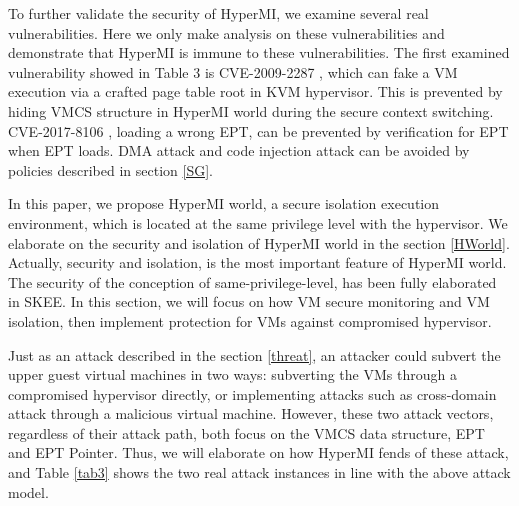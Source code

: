 \documentclass[conference]{IEEEtran}
\begin{document}
To further validate the security of HyperMI, we examine several real vulnerabilities. Here we only make analysis on these vulnerabilities and demonstrate that HyperMI is immune to these vulnerabilities. The first examined vulnerability showed in Table 3 is CVE-2009-2287 \cite{cve2009}, which can fake a VM execution via a crafted page table root in KVM hypervisor. This is prevented by hiding VMCS structure in HyperMI world during the secure context switching. CVE-2017-8106 \cite{cve2017}, loading a wrong EPT, can be prevented by verification for EPT when EPT loads. DMA attack and code injection attack can be avoided by policies described in section \ref{SG}.

\fi




In this paper, we propose HyperMI world, a secure isolation execution environment, which is located at the same privilege level with the hypervisor. We elaborate on the security and isolation of HyperMI world in the section \ref{HWorld}. Actually, security and isolation, is the most important feature of HyperMI world. The security of the conception of same-privilege-level, has been fully elaborated in SKEE. 
In this section, we will focus on how VM secure monitoring and VM isolation, then implement protection for VMs against compromised hypervisor. 

Just as an attack described in the section \ref{threat}, an attacker could subvert the upper guest virtual machines in two ways: subverting the VMs through a compromised hypervisor directly, or implementing attacks such as cross-domain attack through a malicious virtual machine. However, these two attack vectors, regardless of their attack path, both focus on the VMCS data structure, EPT and EPT Pointer. Thus, we will elaborate on how HyperMI fends of these attack, and Table \ref{tab3} shows the two real attack instances in line with the above attack model. 
\end{document}
